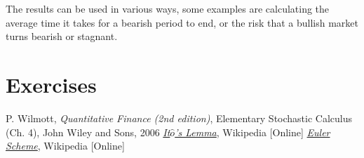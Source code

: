 The results can be used in various ways, some examples are calculating the average time it takes for a bearish period to end, or the risk that a bullish market turns bearish or stagnant.

\section*{Exercises}


\begin{thebibliography}{9}
 P. Wilmott, \emph{Quantitative Finance (2nd edition)}, Elementary Stochastic Calculus (Ch. 4), John Wiley and Sons, 2006 
\href{https://en.wikipedia.org/wiki/It\%C3\%B4\%27s_lemma}{\emph{It$\hat{o}$'s Lemma}}, Wikipedia [Online]
 \href{https://en.wikipedia.org/wiki/Euler_method}{\emph{Euler Scheme}}, Wikipedia [Online]
\end{thebibliography}









